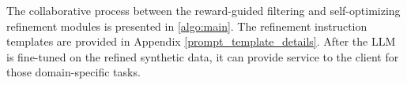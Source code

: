 


The collaborative process between the reward-guided filtering and self-optimizing refinement modules is presented in \cref{algo:main}. 
The refinement instruction templates are provided in Appendix \ref{prompt_template_details}.
After the LLM is fine-tuned on the refined synthetic data, it can provide service to the client for those domain-specific tasks.




